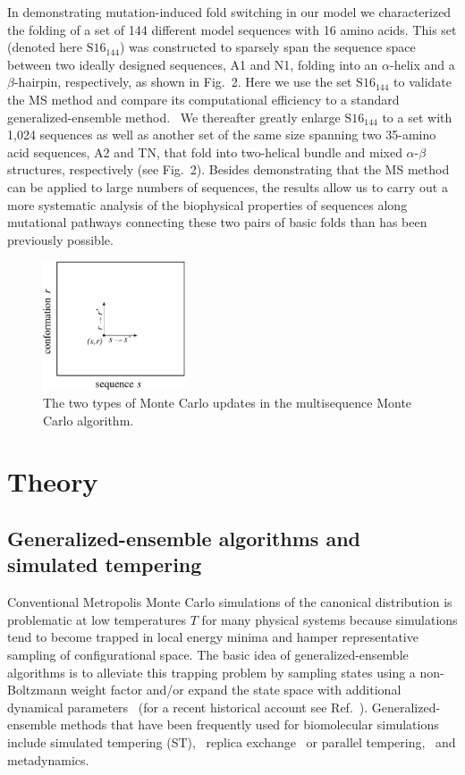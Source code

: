 \documentclass[
aip,
rsi,%
amsmath,amssymb,
reprint,%
]{revtex4-1}
\newcommand {\SR}		{${\mathrm{S16}_{144}}$}
\begin{document}
In demonstrating mutation-induced fold switching in our model we characterized the folding of a set of 144 different model sequences with 16 amino acids. This set (denoted here {\SR}) was constructed to sparsely span the sequence space between two ideally designed sequences, A1 and N1, folding into an $\alpha$-helix and a $\beta$-hairpin, respectively, as shown in Fig.~2. Here we use the set {\SR} to validate the MS method and compare its computational efficiency to a standard generalized-ensemble method.~\cite{Marinari1992,Lyubartsev1992} We thereafter greatly enlarge {\SR} to a set with 1,024 sequences as well as another set of the same size spanning two 35-amino acid sequences, A2 and TN, that fold into two-helical bundle and mixed $\alpha$-$\beta$ structures, respectively (see Fig.~2). Besides demonstrating that the MS method can be applied to large numbers of sequences, the results allow us to carry out a more systematic analysis of the biophysical properties of sequences along mutational pathways connecting these two pairs of basic folds than has been previously possible. 

\begin{figure}
\includegraphics[width=4.2cm]{./Fig1}
\caption{The two types of Monte Carlo updates in the multisequence Monte Carlo algorithm.}
\end{figure}

\section{Theory}

\subsection{Generalized-ensemble algorithms and simulated tempering}

Conventional {\color{red} Metropolis} Monte Carlo simulations of the canonical distribution is problematic at low temperatures $T$ for many physical systems because simulations tend to become trapped in local energy minima and hamper representative sampling of configurational space. The basic idea of generalized-ensemble algorithms is to alleviate this trapping problem by sampling states using a non-Boltzmann weight factor and/or expand the state space with additional dynamical parameters~\cite{Mitsutake2001} {\color{red} (for a recent historical account see Ref.~). Generalized-ensemble methods that have been frequently used for biomolecular simulations include simulated tempering (ST),~\cite{Marinari1992,Lyubartsev1992} replica exchange~\cite{Swendsen1986}  or parallel tempering,~\cite{Hansmann1997} and metadynamics.~\cite{Laio2002}}
\end{document}
